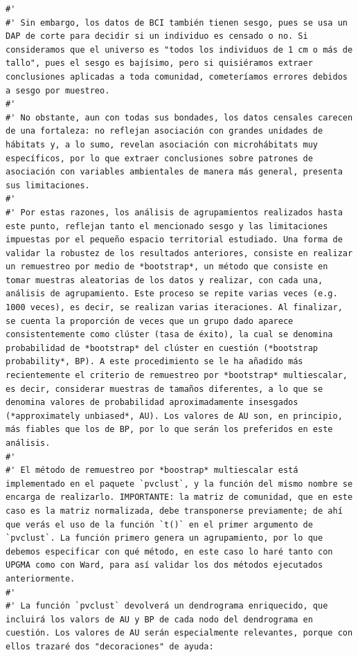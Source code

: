 \documentclass[11pt,]{article}
\begin{document}
\begin{verbatim}
#' 
#' Sin embargo, los datos de BCI también tienen sesgo, pues se usa un DAP de corte para decidir si un individuo es censado o no. Si consideramos que el universo es "todos los individuos de 1 cm o más de tallo", pues el sesgo es bajísimo, pero si quisiéramos extraer conclusiones aplicadas a toda comunidad, cometeríamos errores debidos a sesgo por muestreo.
#' 
#' No obstante, aun con todas sus bondades, los datos censales carecen de una fortaleza: no reflejan asociación con grandes unidades de hábitats y, a lo sumo, revelan asociación con microhábitats muy específicos, por lo que extraer conclusiones sobre patrones de asociación con variables ambientales de manera más general, presenta sus limitaciones.
#' 
#' Por estas razones, los análisis de agrupamientos realizados hasta este punto, reflejan tanto el mencionado sesgo y las limitaciones impuestas por el pequeño espacio territorial estudiado. Una forma de validar la robustez de los resultados anteriores, consiste en realizar un remuestreo por medio de *bootstrap*, un método que consiste en tomar muestras aleatorias de los datos y realizar, con cada una, análisis de agrupamiento. Este proceso se repite varias veces (e.g. 1000 veces), es decir, se realizan varias iteraciones. Al finalizar, se cuenta la proporción de veces que un grupo dado aparece consistentemente como clúster (tasa de éxito), la cual se denomina probabilidad de *bootstrap* del clúster en cuestión (*bootstrap probability*, BP). A este procedimiento se le ha añadido más recientemente el criterio de remuestreo por *bootstrap* multiescalar, es decir, considerar muestras de tamaños diferentes, a lo que se denomina valores de probabilidad aproximadamente insesgados (*approximately unbiased*, AU). Los valores de AU son, en principio, más fiables que los de BP, por lo que serán los preferidos en este análisis.
#' 
#' El método de remuestreo por *boostrap* multiescalar está implementado en el paquete `pvclust`, y la función del mismo nombre se encarga de realizarlo. IMPORTANTE: la matriz de comunidad, que en este caso es la matriz normalizada, debe transponerse previamente; de ahí que verás el uso de la función `t()` en el primer argumento de `pvclust`. La función primero genera un agrupamiento, por lo que debemos especificar con qué método, en este caso lo haré tanto con UPGMA como con Ward, para así validar los dos métodos ejecutados anteriormente.
#' 
#' La función `pvclust` devolverá un dendrograma enriquecido, que incluirá los valors de AU y BP de cada nodo del dendrograma en cuestión. Los valores de AU serán especialmente relevantes, porque con ellos trazaré dos "decoraciones" de ayuda:

\end{verbatim}
\end{document}
